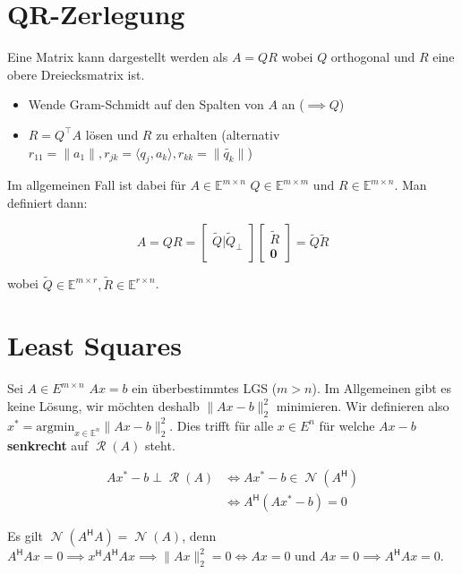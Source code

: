 \documentclass[a4paper,10pt]{article}
\DeclareMathOperator{\Columnspace}{\mathcal{R}}
\DeclareMathOperator{\Nullspace}{\mathcal{N}}
\newcommand*{\hermconj}{\mathsf{H}}
\def\E{\mathbb{E}}
\begin{document}
\section{QR-Zerlegung}

Eine Matrix kann dargestellt werden als $A = QR$ wobei $Q$ orthogonal und $R$ eine obere Dreiecksmatrix ist.

\begin{itemize}
  \item Wende Gram-Schmidt auf den Spalten von $A$ an ($\implies Q$)
  \item $R = Q^\top A$ lösen und $R$ zu erhalten (alternativ $r_{11} = \lVert a_1 \rVert, r_{jk} = \langle q_j, a_k \rangle, r_{kk} = \lVert \widetilde{q_k} \rVert$)
\end{itemize}

Im allgemeinen Fall ist dabei für $A \in \E^{m \times n}$ $Q \in \E^{m \times m}$ und $R \in \E^{m \times n}$. Man definiert dann:

$$A = QR = \begin{bmatrix}
  \widetilde{Q} | \widetilde{Q}_\perp\\
\end{bmatrix} \begin{bmatrix}
  \widetilde{R}\\
  \hline
  \mathbf{0}
\end{bmatrix} = \widetilde{Q} \widetilde{R}$$

wobei $\widetilde{Q} \in \E^{m \times r}, \widetilde{R} \in \E^{r \times n}$.

\section{Least Squares}

Sei $A \in E^{m \times n}$ $Ax = b$ ein überbestimmtes LGS ($m > n$). Im Allgemeinen gibt es keine Lösung, wir möchten deshalb $\lVert Ax - b \rVert_2^2$ minimieren. Wir definieren also $x^\ast = \text{argmin}_{x \in \E^n} \lVert Ax - b \rVert_2^2$. Dies trifft für alle $x \in E^n$ für welche $Ax - b$ \textbf{senkrecht} auf $\Columnspace(A)$ steht. 

\begin{align*}
  Ax^\ast - b \perp \Columnspace(A) & \iff Ax^\ast - b \in \Nullspace(A^\hermconj)\\
  & \iff A^\hermconj(Ax^\ast - b) = 0
\end{align*}

Es gilt $\Nullspace(A^\hermconj A) = \Nullspace(A)$, denn $A^\hermconj A x = 0 \implies x^\hermconj A^\hermconj Ax \implies \lVert Ax \rVert_2^2 = 0 \iff Ax = 0$ und $Ax = 0 \implies A^\hermconj Ax = 0$.
\end{document}
